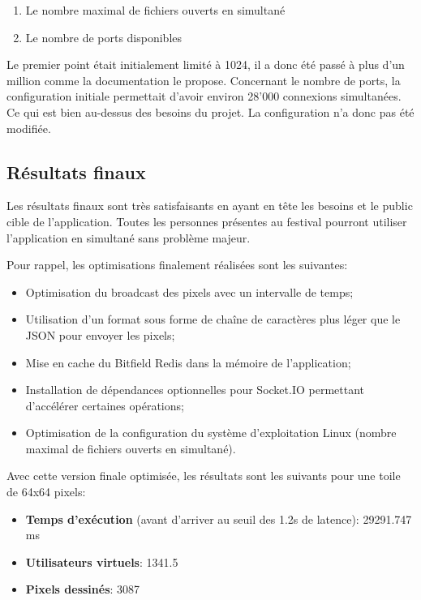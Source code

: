 \begin{enumerate}
  \item Le nombre maximal de fichiers ouverts en simultané
  \item Le nombre de ports disponibles
\end{enumerate}

Le premier point était initialement limité à 1024, il a donc été passé à plus d'un million comme la documentation le propose. Concernant le nombre de ports, la configuration initiale permettait d'avoir environ 28'000 connexions simultanées. Ce qui est bien au-dessus des besoins du projet. La configuration n'a donc pas été modifiée.

\subsection{Résultats finaux}

Les résultats finaux sont très satisfaisants en ayant en tête les besoins et le public cible de l'application. Toutes les personnes présentes au festival pourront utiliser l'application en simultané sans problème majeur.

Pour rappel, les optimisations finalement réalisées sont les suivantes:

\begin{itemize}
  \item Optimisation du broadcast des pixels avec un intervalle de temps;
  \item Utilisation d'un format sous forme de chaîne de caractères plus léger que le JSON pour envoyer les pixels;
  \item Mise en cache du Bitfield Redis dans la mémoire de l'application;
  \item Installation de dépendances optionnelles pour Socket.IO permettant d'accélérer certaines opérations;
  \item Optimisation de la configuration du système d'exploitation Linux (nombre maximal de fichiers ouverts en simultané).
\end{itemize}

Avec cette version finale optimisée, les résultats sont les suivants pour une toile de 64x64 pixels:

\begin{itemize}
  \item \textbf{Temps d'exécution} (avant d'arriver au seuil des 1.2s de latence): 29291.747 ms
  \item \textbf{Utilisateurs virtuels}: 1341.5
  \item \textbf{Pixels dessinés}: 3087
\end{itemize}

